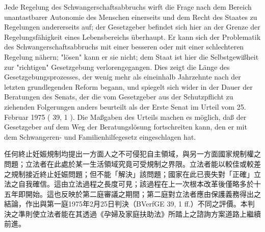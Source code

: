 \documentclass[12pt]{article}
\begin{document}
\begin{sourcepara}[title={原文SondervotumMS.270}]
Jede Regelung des Schwangerschaftsabbruchs wirft die Frage nach dem Bereich unantastbarer Autonomie des Menschen einerseits und dem Recht des Staates zu Regelungen andererseits auf; der Gesetzgeber befindet sich hier an der Grenze der Regelungsfähigkeit eines Lebensbereichs überhaupt. Er kann sich der Problematik des Schwangerschaftsabbruchs mit einer besseren oder mit einer schlechteren Regelung nähern; "lösen" kann er sie nicht; dem Staat ist hier die Selbstgewißheit zur "richtigen" Gesetzgebung verlorengegangen. Dies zeigt die Länge des Gesetzgebungsprozesses, der wenig mehr als eineinhalb Jahrzehnte nach der letzten grundlegenden Reform begann, und spiegelt sich wider in der Dauer der Beratungen des Senats, der die vom Gesetzgeber aus der Schutzpflicht zu ziehenden Folgerungen anders beurteilt als der Erste Senat im Urteil vom 25. Februar 1975 (\abbrBVerfGE{} 39, 1 \abbrFF{}). Die Maßgaben des Urteils machen es möglich, daß der Gesetzgeber auf dem Weg der Beratungslösung fortschreiten kann, den er mit dem Schwangeren- und Familienhilfegesetz eingeschlagen hat.
\end{sourcepara}
\begin{transpara}
任何終止妊娠規制均提出一方面人之不可侵犯自主領域，與另一方面國家規制權之問題；立法者在此處於某一生活領域究竟可受規制之界限。立法者能以較佳或較差之規制接近終止妊娠問題；但不能「解決」該問題；國家在此已喪失對「正確」立法之自我確信。這由立法過程之長度可見；該過程在上一次根本改革後僅略多於十五年即開始。這也反映於第二庭審議之期間；第二庭對立法者應由保護義務得出之結論，作出與第一庭1975年2月25日判決（BVerfGE 39, 1 ff.）不同之評價。本判決之準則使立法者能在其透過《孕婦及家庭扶助法》所踏上之諮詢方案道路上繼續前進。
\end{transpara}
\end{document}
